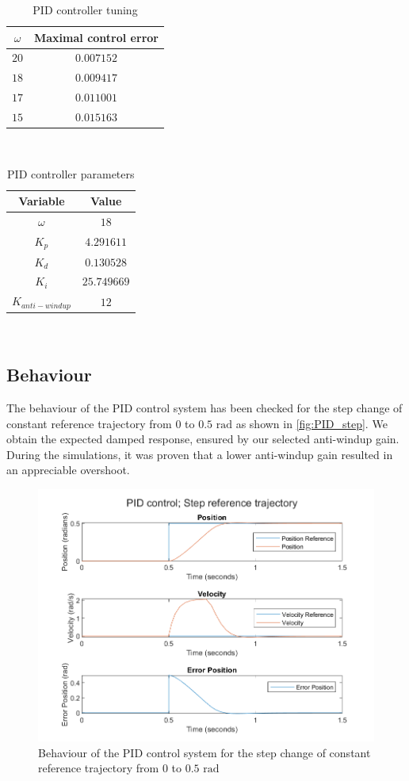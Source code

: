 \begin{table}
    \centering
    \begin{tabular}{c | c}
        $\omega$ & Maximal control error \\ \hline\hline
        $20$ & $0.007152$ \\ \hline
        $18$ & $0.009417$ \\ \hline
        $17$ & $0.011001$ \\ \hline
        $15$ & $0.015163$ \\ \hline
    \end{tabular}
    \\ [1ex]
    \caption{PID controller tuning}
    \label{table:pid-tuning}
\end{table}

\begin{table}
    \centering
    \begin{tabular}{c | c}
        Variable & Value \\ \hline\hline
        $\omega$ & $18$ \\ \hline
        $K_p$ & $4.291611$ \\ \hline
        $K_d$ & $0.130528$ \\ \hline
        $K_i$ & $25.749669$ \\ \hline
        $K_{anti-windup}$ & $12$ \\ \hline
    \end{tabular}
    \\ [1ex]
    \caption{PID controller parameters}
    \label{table:pid-constants}
\end{table}

\subsection{Behaviour}
\label{subsec:pid-behaviour}
The behaviour of the PID control system has been checked for the step change of
constant reference trajectory from $0$ to $0.5\text{ rad}$ as shown in
\autoref{fig:PID_step}. We obtain the expected damped response,
ensured by our selected anti-windup gain. During the simulations, it was proven
that a lower anti-windup gain resulted in an appreciable overshoot.

\begin{figure}
    \centering
    \includegraphics[width=.7\textwidth]{PID_step.png}
    \caption{Behaviour of the PID control system for the step change of constant reference trajectory from $0$ to $0.5\text{ rad}$}
    \label{fig:PID_step}
\end{figure}


